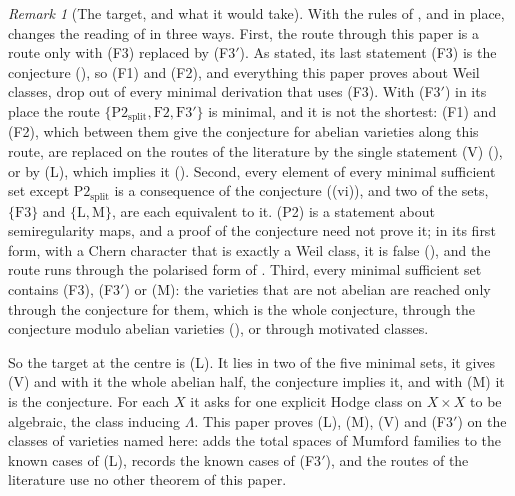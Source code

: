 \documentclass[11pt,reqno]{amsart}
\theoremstyle{plain}
\theoremstyle{definition}
\theoremstyle{remark}
\newtheorem{remark}[theorem]{Remark}
\begin{document}
\begin{remark}[The target, and what it would take]\label{rem:bullseye}
With the rules of ,  and
 in place,  changes the reading of
 in three ways. First, the route through this paper is
a route only with (F3) replaced by \textup{(F3$'$)}. As stated, its last
statement (F3) is the conjecture (), so (F1) and (F2), and
everything this paper proves about Weil classes, drop out of every minimal
derivation that uses (F3). With \textup{(F3$'$)} in its place the route
$\{\mathrm{P2}_{\mathrm{split}},\mathrm{F2},\mathrm{F3}'\}$ is minimal, and it is not the
shortest: (F1) and (F2), which between them give the conjecture for abelian
varieties along this route, are replaced on the routes of the literature by
the single statement \textup{(V)} (), or by \textup{(L)},
which implies it (). Second, every element of every minimal sufficient set
except $\mathrm{P2}_{\mathrm{split}}$ is a consequence of the conjecture
((vi)), and
two of the sets, $\{\mathrm{F3}\}$ and $\{\mathrm{L},\mathrm{M}\}$, are
each equivalent to it. (P2) is a statement about semiregularity maps, and a
proof of the conjecture need not prove it; in its first form, with a Chern
character that is exactly a Weil class, it is false (\cite[Theorem~3.5]{paperII}), and
the route runs through the polarised form of \cite[Remark~3.6]{paperII}. Third, every minimal sufficient set
contains (F3), \textup{(F3$'$)} or \textup{(M)}: the varieties that are not
abelian are reached only through the conjecture for them, which is the whole
conjecture, through the conjecture modulo abelian varieties
(), or through motivated classes.

So the target at the centre is \textup{(L)}. It lies in two of the five
minimal sets, it gives \textup{(V)} and with it the whole abelian half, the
conjecture implies it, and with \textup{(M)} it is the conjecture. For each
$X$ it asks for one explicit Hodge class on $X\times X$ to be algebraic, the
class inducing $\Lambda$. This paper proves \textup{(L)}, \textup{(M)},
\textup{(V)} and \textup{(F3$'$)} on the classes of varieties named here:
 adds the total spaces of Mumford families to the
known cases of \textup{(L)},  records the known cases of
\textup{(F3$'$)}, and the routes of the literature use no other theorem of
this paper.
\end{remark}
\end{document}
